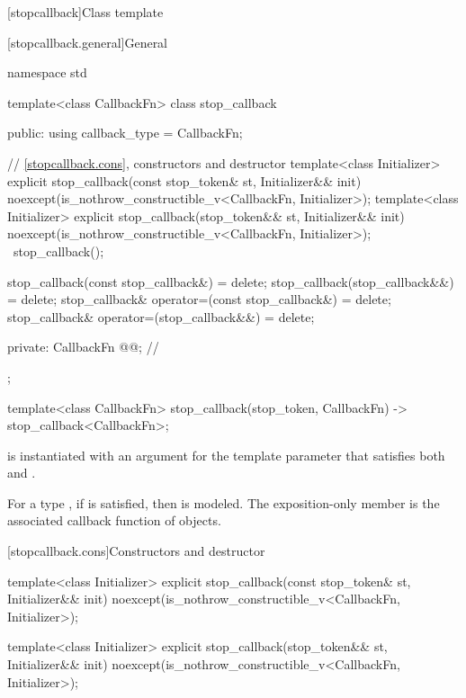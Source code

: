 [stopcallback]{Class template }%
%

[stopcallback.general]{General}

\pnum
{}%
\begin{codeblock}
namespace std {
  template<class CallbackFn>
  class stop_callback {
  public:
    using callback_type = CallbackFn;

    // \ref{stopcallback.cons}, constructors and destructor
    template<class Initializer>
      explicit stop_callback(const stop_token& st, Initializer&& init)
        noexcept(is_nothrow_constructible_v<CallbackFn, Initializer>);
    template<class Initializer>
      explicit stop_callback(stop_token&& st, Initializer&& init)
        noexcept(is_nothrow_constructible_v<CallbackFn, Initializer>);
    ~stop_callback();

    stop_callback(const stop_callback&) = delete;
    stop_callback(stop_callback&&) = delete;
    stop_callback& operator=(const stop_callback&) = delete;
    stop_callback& operator=(stop_callback&&) = delete;

  private:
    CallbackFn @@;                                     // \expos
  };

  template<class CallbackFn>
    stop_callback(stop_token, CallbackFn) -> stop_callback<CallbackFn>;
}
\end{codeblock}

\pnum
\mandates
{} is instantiated with an argument for the
template parameter 
that satisfies both 
and .

\pnum
\remarks
For a type ,
if
is satisfied, then
 is modeled.
The exposition-only  member is
the associated callback function of
 objects.

[stopcallback.cons]{Constructors and destructor}

%
\begin{itemdecl}
template<class Initializer>
  explicit stop_callback(const stop_token& st, Initializer&& init)
    noexcept(is_nothrow_constructible_v<CallbackFn, Initializer>);

template<class Initializer>
  explicit stop_callback(stop_token&& st, Initializer&& init)
    noexcept(is_nothrow_constructible_v<CallbackFn, Initializer>);
\end{itemdecl}

